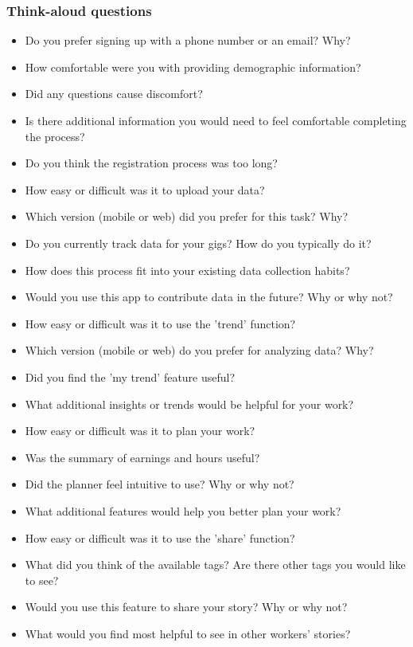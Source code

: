 \subsubsection{Think-aloud questions}\label{thinkaloud}
\begin{itemize}
    \item Do you prefer signing up with a phone number or an email? Why?
    \item How comfortable were you with providing demographic information?
    \item Did any questions cause discomfort?
    \item Is there additional information you would need to feel comfortable completing the process?
    \item Do you think the registration process was too long?

    \item How easy or difficult was it to upload your data?
    \item Which version (mobile or web) did you prefer for this task? Why?
    \item Do you currently track data for your gigs? How do you typically do it?
    \item How does this process fit into your existing data collection habits?
    \item Would you use this app to contribute data in the future? Why or why not?

    \item How easy or difficult was it to use the 'trend' function?
    \item Which version (mobile or web) do you prefer for analyzing data? Why?
    \item Did you find the 'my trend' feature useful?
    \item What additional insights or trends would be helpful for your work?

    \item How easy or difficult was it to plan your work?
    \item Was the summary of earnings and hours useful?
    \item Did the planner feel intuitive to use? Why or why not?
    \item What additional features would help you better plan your work?

    \item How easy or difficult was it to use the 'share' function?
    \item What did you think of the available tags? Are there other tags you would like to see?
    \item Would you use this feature to share your story? Why or why not?
    \item What would you find most helpful to see in other workers' stories?


\end{itemize}
